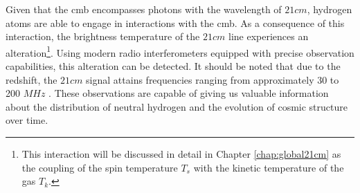 \documentclass[12pt, TexShade, letterpaper]{report}
\begin{document}
Given that the \gls{cmb} encompasses photons with the wavelength of $21cm$, hydrogen atoms are able to engage in interactions with the \gls{cmb}. As a consequence of this interaction, the brightness temperature of the $21cm$ line experiences an alteration\footnote{This interaction will be discussed in detail in Chapter \ref{chap:global21cm} as the coupling of the spin temperature $T_s$ with the kinetic temperature of the gas $T_k$.}. Using modern radio interferometers equipped with precise observation capabilities, this alteration can be detected. It should be noted that due to the redshift, the $21cm$ signal attains frequencies ranging from approximately 30 to 200 $MHz$ \cite{low_frequency}. These observations are capable of giving us valuable information about the distribution of neutral hydrogen and the evolution of cosmic structure over time\cite{low_frequency}.\par
\end{document}
